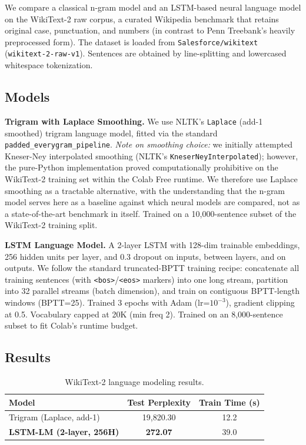 \documentclass[11pt,a4paper]{article}
\begin{document}
We compare a classical n-gram model and an LSTM-based neural language model on the WikiText-2 raw corpus, a curated Wikipedia benchmark that retains original case, punctuation, and numbers (in contrast to Penn Treebank's heavily preprocessed form). The dataset is loaded from \texttt{Salesforce/wikitext} (\texttt{wikitext-2-raw-v1}). Sentences are obtained by line-splitting and lowercased whitespace tokenization.

\subsection{Models}

\textbf{Trigram with Laplace Smoothing.} We use NLTK's \texttt{Laplace} (add-1 smoothed) trigram language model, fitted via the standard \texttt{padded\_everygram\_pipeline}. \emph{Note on smoothing choice:} we initially attempted Kneser-Ney interpolated smoothing (NLTK's \texttt{KneserNeyInterpolated}); however, the pure-Python implementation proved computationally prohibitive on the WikiText-2 training set within the Colab Free runtime. We therefore use Laplace smoothing as a tractable alternative, with the understanding that the n-gram model serves here as a baseline against which neural models are compared, not as a state-of-the-art benchmark in itself. Trained on a 10{,}000-sentence subset of the WikiText-2 training split.

\textbf{LSTM Language Model.} A 2-layer LSTM with 128-dim trainable embeddings, 256 hidden units per layer, and 0.3 dropout on inputs, between layers, and on outputs. We follow the standard truncated-BPTT training recipe: concatenate all training sentences (with \texttt{<bos>}/\texttt{<eos>} markers) into one long stream, partition into 32 parallel streams (batch dimension), and train on contiguous BPTT-length windows (BPTT=25). Trained 3 epochs with Adam (lr=$10^{-3}$), gradient clipping at 0.5. Vocabulary capped at 20K (min freq 2). Trained on an 8{,}000-sentence subset to fit Colab's runtime budget.

\subsection{Results}

\begin{table}[h!]
\centering
\small
\caption{WikiText-2 language modeling results.}
\begin{tabular}{lcc}
\toprule
\textbf{Model} & \textbf{Test Perplexity} & \textbf{Train Time (s)}\\
\midrule
Trigram (Laplace, add-1)        & 19{,}820.30 & 12.2\\
\textbf{LSTM-LM (2-layer, 256H)} & \textbf{272.07} & 39.0\\
\bottomrule
\end{tabular}
\end{table}
\end{document}
